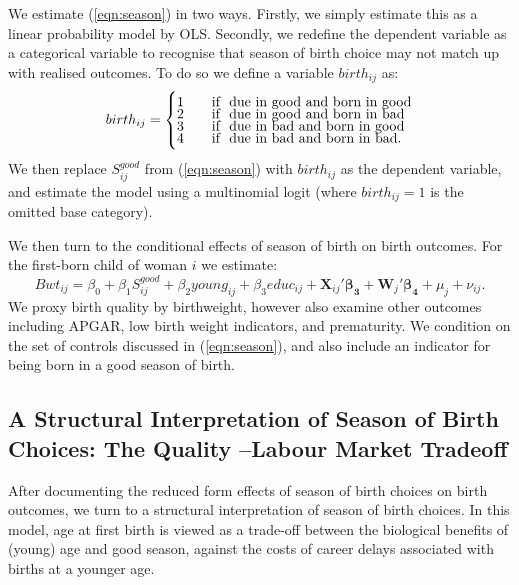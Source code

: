 \documentclass[a4paper, 11 pt]{article}
\theoremstyle{plain}
\begin{document}
\begin{spacing}{1.4}
We estimate (\ref{eqn:season}) in two ways. Firstly, we simply estimate this
as a linear probability model by OLS.  Secondly, we redefine the dependent 
variable as a categorical variable to recognise that season of birth choice
may not match up with realised outcomes.  To do so we define a variable 
$birth_{ij}$ as:
\[ birth_{ij} =
 \begin{cases}
  1 & \quad \text{if } \text{ due in good and born in good} \vspace{-2mm}\\ 
  2 & \quad \text{if } \text{ due in good and born in bad } \vspace{-2mm}\\
  3 & \quad \text{if } \text{ due in bad and born in good } \vspace{-2mm}\\
  4 & \quad \text{if } \text{ due in bad and born in bad. }              \\
  \end{cases}
\]
We then replace $S^{good}_{ij}$ from (\ref{eqn:season}) with $birth_{ij}$ as the
dependent variable, and estimate the model using a multinomial logit (where 
$birth_{ij}=1$ is the omitted base category).

We then turn to the conditional effects of season of birth on birth outcomes.
For the first-born child of woman $i$ we estimate:
\begin{equation}
\label{eqn:quality}
Bwt_{ij} = \beta_0 + \beta_1 S^{good}_{ij} + \beta_2 young_{ij} + \beta_3 educ_{ij}  + 
\mathbf{X}_{ij}'\mathbf{\beta_3} + \mathbf{W}_{j}'\mathbf{\beta_4} + \mu_j +\nu_{ij}. 
\end{equation}
We proxy birth quality by birthweight, however also examine other outcomes 
including APGAR, low birth weight indicators, and prematurity.  We condition on
the set of controls discussed in (\ref{eqn:season}), and also include an 
indicator for being born in a good season of birth.


\subsection{A Structural Interpretation of Season of Birth Choices: The Quality%
--Labour Market Tradeoff}
After documenting the reduced form effects of season of birth choices on birth
outcomes, we turn to a structural interpretation of season of birth choices. In
this model, age at first birth is viewed as a trade-off between the biological
benefits of (young) age and good season, against the costs of career delays 
associated with births at a younger age.
 

\end{spacing}
\end{document}
